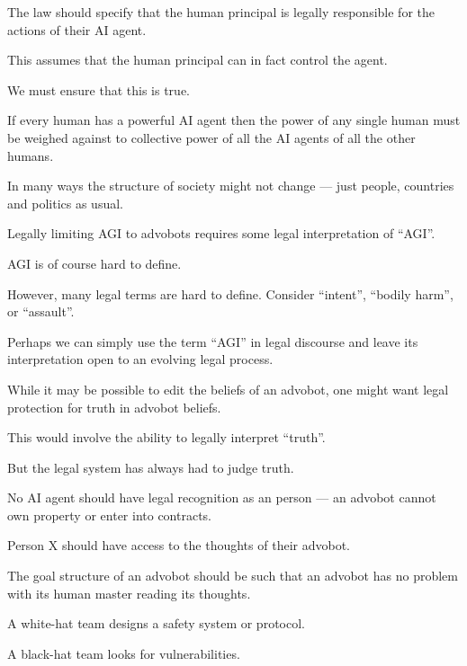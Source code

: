 {

The law should specify that the human principal is legally responsible for the actions of their AI agent.

\vfill
This assumes that the human principal can in fact control the agent.

\vfill
We must ensure that this is true.


If every human has a powerful AI agent then the power of any single human must be weighed against to collective power of all the AI agents of all the other humans.

\vfill
In many ways the structure of society might not change --- just people, countries and politics as usual.


Legally limiting AGI to advobots requires some legal interpretation of ``AGI''.

\vfill
AGI is of course hard to define.

\vfill
However, many legal terms are hard to define.  Consider ``intent'', ``bodily harm'', or ``assault''.

\vfill
Perhaps we can simply use the term ``AGI'' in legal discourse and leave its interpretation open to an evolving legal process.


While it may be possible to edit the beliefs of an advobot, one might want legal protection for truth in advobot beliefs.

\vfill
This would involve the ability to legally interpret ``truth''.

\vfill
But the legal system has always had to judge truth.


No AI agent should have legal recognition as an person --- an advobot cannot own property or enter into contracts.

\vfill
Person X should have access to the thoughts of their advobot.

\vfill
The goal structure of an advobot should be such that an advobot has no problem
with its human master reading its thoughts.


A white-hat team designs a safety system or protocol.

\vfill
A black-hat team looks for vulnerabilities.

}
